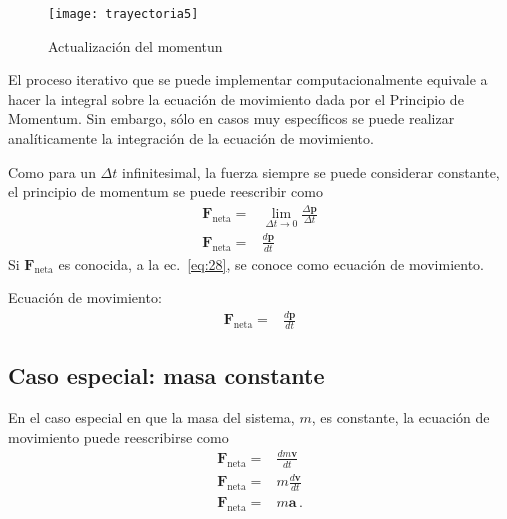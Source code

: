 \begin{frame}
  \begin{figure}
    \centering
{\texttt{[image: trayectoria5]}}
    \caption{Actualización del momentun}
    \label{fig:1}
  \end{figure}
\end{frame}

El proceso iterativo que se puede implementar computacionalmente equivale a hacer la integral sobre la ecuación de movimiento dada por el Principio de Momentum. Sin embargo, sólo en casos muy específicos se puede realizar analíticamente la integración de la ecuación de movimiento.


Como para un $\Delta t$ infinitesimal, la fuerza siempre se puede considerar constante, el principio de momentum se puede reescribir como
\begin{align}
  \label{eq:28}
  \mathbf{F}_{\text{neta}}=&\lim_{\Delta t\to 0}\frac{\Delta\mathbf{p}}{\Delta t}\nonumber\\
 \mathbf{F}_{\text{neta}}=&\frac{d\mathbf{p} }{dt}
\end{align}
Si $\mathbf{F}_{\text{neta}}$ es conocida, a la ec.~\eqref{eq:28}, se conoce como ecuación de movimiento.

\begin{frame}
  \begin{block}%
{Ecuación de movimiento:}
  \begin{align*}
   \mathbf{F}_{\text{neta}}=&\frac{d\mathbf{p} }{dt}
   \end{align*}
  \end{block}
\end{frame}

\subsection{Caso especial: masa constante}
En el caso especial en que la masa del sistema, $m$, es constante, la ecuación de movimiento puede reescribirse como
\begin{align}
   \mathbf{F}_{\text{neta}}=&\frac{d m\mathbf{v} }{dt}\nonumber\\
   \mathbf{F}_{\text{neta}}=&m\frac{d \mathbf{v} }{dt}\nonumber\\
   \mathbf{F}_{\text{neta}}=&m\mathbf{a}\,.
\end{align}

